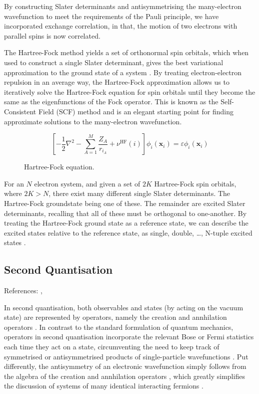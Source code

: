 By constructing Slater determinants and antisymmetrising the many-electron wavefunction to meet the requirements of the Pauli principle, we have incorporated exchange correlation, in that, the motion of two electrons with parallel spins is now correlated.

The Hartree-Fock method yields a set of orthonormal spin orbitals, which when used to construct a single Slater determinant, gives the best variational approximation to the ground state of a system \cite{Atilla1996}. By treating electron-electron repulsion in an average way, the Hartree-Fock approximation allows us to iteratively solve the Hartree-Fock equation for spin orbitals until they become the same as the eigenfunctions of the Fock operator. This is known as the Self-Consistent Field (SCF) method and is an elegant starting point for finding approximate solutions to the many-electron wavefunction.

\begin{figure}[H]
\centering
\begin{equation*}
\left[
-\frac{1}{2}\nabla^2 - \sum_{A=1}^M \frac{Z_A}{r_{i_A}} + \nu^\text{HF}(i)
\right]
\phi_i(\mathbf x_i) = \varepsilon \phi_i(\mathbf x_i)
\end{equation*}
\caption{Hartree-Fock equation.}
\end{figure}

For an $N$ electron system, and given a set of $2K$ Hartree-Fock spin orbitals, where $2K > N$, there exist many different single Slater determinants. The Hartree-Fock groundstate being one of these. The remainder are excited Slater determinants, recalling that all of these must be orthogonal to one-another. By treating the Hartree-Fock ground state as a reference state, we can describe the excited states relative to the reference state, as single, double, \dots, N-tuple excited states \cite{Atilla1996}.

\subsection{\label{second-quantisation}Second Quantisation}
References: \cite{Helgaker2000}, \cite{Fetter1972}

In second quantisation, both observables and states (by acting on the vacuum state) are represented by operators, namely the creation and annhilation operators \cite{Helgaker2000}. In contrast to the standard formulation of quantum mechanics, operators in second quantisation incorporate the relevant Bose or Fermi statistics each time they act on a state, circumventing the need to keep track of symmetrised or antisymmetrised products of single-particle wavefunctions \cite{Fetter1972}. Put differently, the antisymmetry of an electronic wavefunction simply follows from the algebra of the creation and annhilation operators \cite{Helgaker2000}, which greatly simplifies the discussion of systems of many identical interacting fermions \cite{Fetter1972}.

